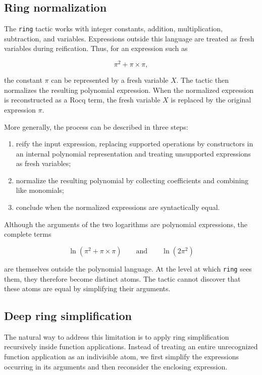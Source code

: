 \documentclass[11pt]{article}
\begin{document}
\subsection{Ring normalization}

The \texttt{ring} tactic works with integer constants, addition, multiplication, subtraction, and variables. Expressions outside this language are treated as fresh variables during reification. Thus, for an expression such as

$$
  \pi^2+\pi\mathbin{\times}\pi,
$$

the constant $\pi$ can be represented by a fresh variable $X$. The tactic then normalizes the resulting polynomial expression. When the normalized expression is reconstructed as a Rocq term, the fresh variable $X$ is replaced by the original expression $\pi$.

More generally, the process can be described in three steps:
\begin{enumerate}
\item reify the input expression, replacing supported operations by constructors in an internal polynomial representation and treating unsupported expressions as fresh variables;
\item normalize the resulting polynomial by collecting coefficients and combining like monomials;
\item conclude when the normalized expressions are syntactically equal.
\end{enumerate}


Although the arguments of the two logarithms are polynomial expressions, the complete terms

$$
  \ln(\pi^2+\pi\mathbin{\times}\pi)
  \qquad\text{and}\qquad
  \ln(2\pi^2)
$$

are themselves outside the polynomial language. At the level at which \texttt{ring} sees them, they therefore become distinct atoms. The tactic cannot discover that these atoms are equal by simplifying their arguments.

\subsection{Deep ring simplification}

The natural way to address this limitation is to apply ring simplification recursively inside function applications. Instead of treating an entire unrecognized function application as an indivisible atom, we first simplify the expressions occurring in its arguments and then reconsider the enclosing expression.
\end{document}
